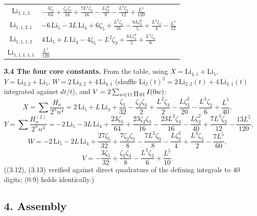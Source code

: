 \documentclass[11pt]{article}
\theoremstyle{remark}
\newcommand{\shuffle}{\mathbin{\rotatebox[origin=c]{180}{\ensuremath{\amalg}}}}
\begin{document}
\begin{center}
\begin{tabular}{|c|l|}
$\mathrm{Li}_{1,1,3}$ & $-\tfrac{3\zeta_5}{64}+\tfrac{\zeta_2\zeta_3}{16}+\tfrac{7L^2\zeta_3}{16}-\tfrac{L\zeta_2^2}8-\tfrac{L^3\zeta_2}{12}+\tfrac{L^5}{120}$\\
$\mathrm{Li}_{1,1,2,1}$ & $-6\,\mathrm{Li}_5-3L\,\mathrm{Li}_4+6\zeta_5+\tfrac{L^2\zeta_3}{16}-\tfrac{6L\zeta_2^2}5+\tfrac{L^3\zeta_2}4-\tfrac{L^5}{12}$\\
$\mathrm{Li}_{1,1,1,2}$ & $4\,\mathrm{Li}_5+L\,\mathrm{Li}_4-4\zeta_5-L^2\zeta_3+\tfrac{6L\zeta_2^2}5+\tfrac{L^3\zeta_2}6$\\
$\mathrm{Li}_{1,1,1,1,1}$ & $\tfrac{L^5}{120}$\\
\hline
\end{tabular}
\end{center}

\textbf{3.4 The four core constants.} From the table, using $X=\mathrm{Li}_{4,1}+\mathrm{Li}_5$, $Y=\mathrm{Li}_{3,2}+\mathrm{Li}_5$, $W=2\,\mathrm{Li}_{3,2}+4\,\mathrm{Li}_{4,1}$ (shuffle $\mathrm{Li}_2(t)^2=2\,\mathrm{Li}_{2,2}(t)+4\,\mathrm{Li}_{3,1}(t)$ integrated against $dt/t$), and
$V=2\sum_{w\in 11\,\shuffle\,01}I(0w)$:
\begin{equation*}
X=\sum\frac{H_n}{2^nn^4}
=2\,\mathrm{Li}_5+L\,\mathrm{Li}_4+\frac{\zeta_5}{32}-\frac{\zeta_2\zeta_3}2+\frac{L^2\zeta_3}2-\frac{L\zeta_2^2}{20}-\frac{L^3\zeta_2}6+\frac{L^5}{40}, \tag{3.10}
\end{equation*}
\begin{equation*}
Y=\sum\frac{H^{(2)}_n}{2^nn^3}
=-2\,\mathrm{Li}_5-3L\,\mathrm{Li}_4+\frac{23\zeta_5}{64}+\frac{23\zeta_2\zeta_3}{16}-\frac{23L^2\zeta_3}{16}-\frac{L\zeta_2^2}{40}+\frac{7L^3\zeta_2}{12}-\frac{13L^5}{120}, \tag{3.11}
\end{equation*}
\begin{equation*}
W=-2\,\mathrm{Li}_5-2L\,\mathrm{Li}_4+\frac{27\zeta_5}{32}+\frac{7\zeta_2\zeta_3}8-\frac{7L^2\zeta_3}8-\frac{L\zeta_2^2}4+\frac{L^3\zeta_2}2-\frac{7L^5}{60}, \tag{3.12}
\end{equation*}
\begin{equation*}
V=-\frac{3\zeta_5}{32}+\frac{\zeta_2\zeta_3}8-\frac{L^3\zeta_2}6+\frac{L^5}{10}. \tag{3.13}
\end{equation*}
((3.12), (3.13) verified against direct quadrature of the defining integrals to $40$ digits; (0.9) holds identically.)

\subsection*{4. Assembly}
\end{document}
